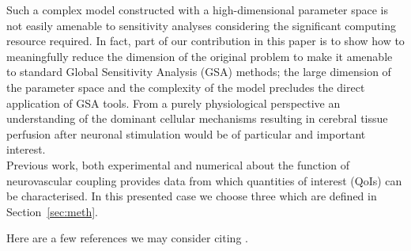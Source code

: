 Such a complex model constructed with a high-dimensional parameter space is not easily amenable to sensitivity analyses considering the significant computing resource required. In fact, part of our contribution in this paper is to show how to meaningfully reduce the dimension of the original problem to make it amenable to standard Global Sensitivity Analysis (GSA) methods; the large dimension of the parameter space and the complexity of the model precludes the  direct application of GSA tools.
From a purely physiological perspective an understanding of the dominant cellular mechanisms resulting in cerebral tissue perfusion after neuronal stimulation would be of particular and important interest.\\
Previous work, both experimental and numerical about the function of neurovascular coupling provides data from which quantities of interest (QoIs) can be characterised. In this presented case we choose three which are defined in Section~\ref{sec:meth}. 

  
  
Here are a few references we may consider citing  \cite{gsa_pharm,lr_gsa,uqpy,Witthoft2013}.
